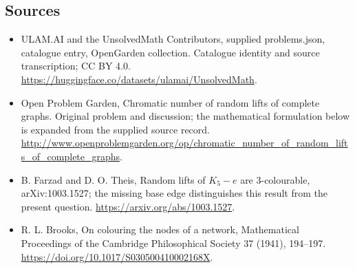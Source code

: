 \documentclass[11pt,a4paper]{article}
\begin{document}
\subsection{Sources}
\begin{itemize}
\item[S1] ULAM.AI and the UnsolvedMath Contributors, supplied problems.json, catalogue entry, OpenGarden collection. Catalogue identity and source transcription; CC BY 4.0.
\url{https://huggingface.co/datasets/ulamai/UnsolvedMath}.
\item[S2] Open Problem Garden, Chromatic number of random lifts of complete graphs. Original problem and discussion; the mathematical formulation below is expanded from the supplied source record.
\url{http://www.openproblemgarden.org/op/chromatic_number_of_random_lifts_of_complete_graphs}.
\item[S3] B. Farzad and D. O. Theis, Random lifts of $K_5-e$ are 3-colourable, arXiv:1003.1527; the missing base edge distinguishes this result from the present question.
\url{https://arxiv.org/abs/1003.1527}.
\item[S4] R. L. Brooks, On colouring the nodes of a network, Mathematical Proceedings of the Cambridge Philosophical Society 37 (1941), 194--197.
\url{https://doi.org/10.1017/S030500410002168X}.
\end{itemize}
\end{document}

